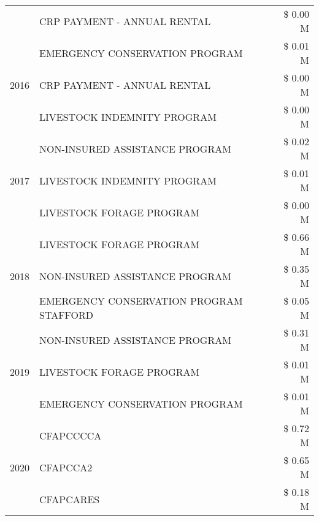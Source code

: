 \begin{tabular}{llr}
 & CRP PAYMENT - ANNUAL RENTAL & \$ 0.00 M \\
\cline{1-3}
\multirow[t]{3}{*}{2016} & EMERGENCY CONSERVATION PROGRAM                & \$ 0.01 M \\
 & CRP PAYMENT - ANNUAL RENTAL                   & \$ 0.00 M \\
 & LIVESTOCK INDEMNITY PROGRAM                   & \$ 0.00 M \\
\cline{1-3}
\multirow[t]{3}{*}{2017} & NON-INSURED ASSISTANCE PROGRAM & \$ 0.02 M \\
 & LIVESTOCK INDEMNITY PROGRAM & \$ 0.01 M \\
 & LIVESTOCK FORAGE PROGRAM & \$ 0.00 M \\
\cline{1-3}
\multirow[t]{3}{*}{2018} & LIVESTOCK FORAGE PROGRAM & \$ 0.66 M \\
 & NON-INSURED ASSISTANCE PROGRAM & \$ 0.35 M \\
 & EMERGENCY CONSERVATION PROGRAM STAFFORD & \$ 0.05 M \\
\cline{1-3}
\multirow[t]{3}{*}{2019} & NON-INSURED ASSISTANCE PROGRAM & \$ 0.31 M \\
 & LIVESTOCK FORAGE PROGRAM & \$ 0.01 M \\
 & EMERGENCY CONSERVATION PROGRAM & \$ 0.01 M \\
\cline{1-3}
\multirow[t]{3}{*}{2020} & CFAPCCCCA & \$ 0.72 M \\
 & CFAPCCA2 & \$ 0.65 M \\
 & CFAPCARES & \$ 0.18 M \\
\cline{1-3}
\bottomrule
\end{tabular}
